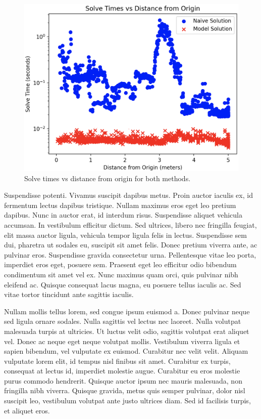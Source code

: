 \documentclass[
	letterpaper, %
	10pt, %
	unnumberedsections, %
	twoside, %
]{LTJournalArticle}
\begin{document}
\begin{figure}
	\includegraphics[width=\linewidth]{graph.png}
	\caption{Solve times vs distance from origin for both methods.}
\end{figure}

Suspendisse potenti. Vivamus suscipit dapibus metus. Proin auctor iaculis ex, id fermentum lectus dapibus tristique. Nullam maximus eros eget leo pretium dapibus. Nunc in auctor erat, id interdum risus. Suspendisse aliquet vehicula accumsan. In vestibulum efficitur dictum. Sed ultrices, libero nec fringilla feugiat, elit massa auctor ligula, vehicula tempor ligula felis in lectus. Suspendisse sem dui, pharetra ut sodales eu, suscipit sit amet felis. Donec pretium viverra ante, ac pulvinar eros. Suspendisse gravida consectetur urna. Pellentesque vitae leo porta, imperdiet eros eget, posuere sem. Praesent eget leo efficitur odio bibendum condimentum sit amet vel ex. Nunc maximus quam orci, quis pulvinar nibh eleifend ac. Quisque consequat lacus magna, eu posuere tellus iaculis ac. Sed vitae tortor tincidunt ante sagittis iaculis.

Nullam mollis tellus lorem, sed congue ipsum euismod a. Donec pulvinar neque sed ligula ornare sodales. Nulla sagittis vel lectus nec laoreet. Nulla volutpat malesuada turpis at ultricies. Ut luctus velit odio, sagittis volutpat erat aliquet vel. Donec ac neque eget neque volutpat mollis. Vestibulum viverra ligula et sapien bibendum, vel vulputate ex euismod. Curabitur nec velit velit. Aliquam vulputate lorem elit, id tempus nisl finibus sit amet. Curabitur ex turpis, consequat at lectus id, imperdiet molestie augue. Curabitur eu eros molestie purus commodo hendrerit. Quisque auctor ipsum nec mauris malesuada, non fringilla nibh viverra. Quisque gravida, metus quis semper pulvinar, dolor nisl suscipit leo, vestibulum volutpat ante justo ultrices diam. Sed id facilisis turpis, et aliquet eros.
\end{document}
